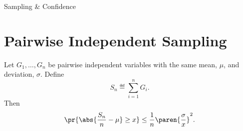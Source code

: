 \documentclass[handout]{mcs}
\begin{document}


\begin{staffnotes}
Sampling \& Confidence
\end{staffnotes}



\section*{Pairwise Independent Sampling}

\begin{theorem*}
Let $G_1, \dots, G_n$ be pairwise independent variables with the same
mean, $\mu$, and deviation, $\sigma$.  Define
\[
S_n \eqdef \sum_{i=1}^n G_i.
\]
Then
\[
\pr{\abs{\frac{S_n}{n} - \mu} \geq x}
    \leq \frac{1}{n} \paren{\frac{\sigma}{x}}^2.
\]
\end{theorem*}
\end{document}
